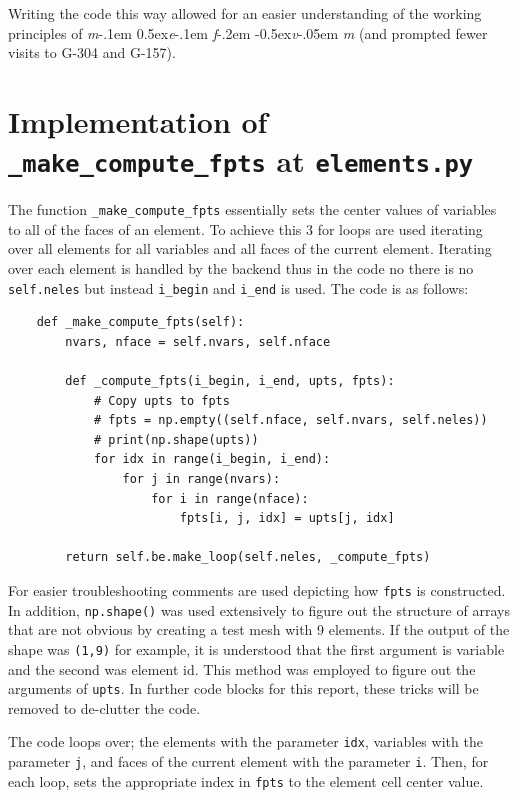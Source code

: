 \documentclass[a4paper, 12pt]{article}
\newcommand\mefvm{%
    \textit{m}\kern-.1em%
    \raise0.5ex\hbox{\textit{e}}\kern-.1em%
    \textit{f}\kern-.2em%
    \raise-0.5ex\hbox{\textit{v}}\kern-.05em%
    \textit{m}
}
\begin{document}
Writing the code this way allowed for an easier understanding of the working principles of \mefvm (and prompted fewer visits to G-304 and G-157).

\section{Implementation of \texttt{\_make\_compute\_fpts} at \texttt{elements.py}}

The function \verb|_make_compute_fpts| essentially sets the center values of variables to all of the faces of an element. To achieve this 3 for loops are used iterating over all elements for all variables and all faces of the current element. Iterating over each element is handled by the backend thus in the code no there is no \verb|self.neles| but instead \verb|i_begin| and \verb|i_end| is used. \newpage 
The code is as follows:

\begin{verbatim}
    def _make_compute_fpts(self):
        nvars, nface = self.nvars, self.nface

        def _compute_fpts(i_begin, i_end, upts, fpts):
            # Copy upts to fpts
            # fpts = np.empty((self.nface, self.nvars, self.neles))
            # print(np.shape(upts))
            for idx in range(i_begin, i_end):
                for j in range(nvars):
                    for i in range(nface):
                        fpts[i, j, idx] = upts[j, idx]

        return self.be.make_loop(self.neles, _compute_fpts)
\end{verbatim}
\par

For easier troubleshooting comments are used depicting how \verb|fpts| is constructed. In addition, \verb|np.shape()| was used extensively to figure out the structure of arrays that are not obvious by creating a test mesh with 9 elements. If the output of the shape was \verb|(1,9)| for example, it is understood that the first argument is variable and the second was element id. This method was employed to figure out the arguments of \verb|upts|. In further code blocks for this report, these tricks will be removed to de-clutter the code.\\\par

The code loops over; the elements with the parameter \verb|idx|, variables with the parameter \verb|j|, and faces of the current element with the parameter \verb|i|. Then, for each loop, sets the appropriate index in \verb|fpts| to the element cell center value.
\end{document}
